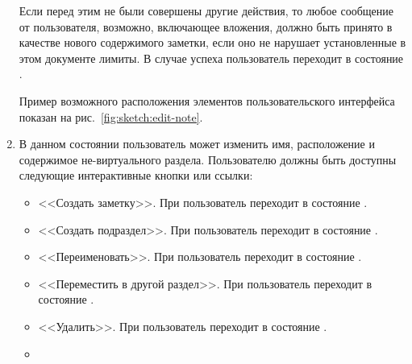 \begin{enumerate}
            Если перед этим не были совершены другие действия, то любое сообщение от пользователя,
            возможно, включающее вложения, должно быть принято в качестве нового содержимого заметки,
            если оно не нарушает установленные в этом документе лимиты. В случае успеха
            пользователь переходит в состояние
            \hyperref[itm:req:ui:states:view-note]
            {}.

            Пример возможного расположения элементов пользовательского интерфейса показан на
            рис.~\ref{fig:sketch:edit-note}.

        \item \label{itm:req:ui:states:edit-section}

            В данном состоянии пользователь может изменить имя, расположение и содержимое не-виртуального
            раздела.
            Пользователю должны быть доступны следующие интерактивные кнопки или ссылки:
            \begin{itemize}
                \item
                    <<Создать заметку>>.
                    При  пользователь переходит в состояние
                    \hyperref[itm:req:ui:states:create-note]
                    {}.
                \item
                    <<Создать подраздел>>.
                    При  пользователь переходит в состояние
                    \hyperref[itm:req:ui:states:create-section]
                    {}.
                \item
                    <<Переименовать>>.
                    При  пользователь переходит в состояние
                    \hyperref[itm:req:ui:states:rename-kbo]
                    {}.
                \item
                    <<Переместить в другой раздел>>.
                    При  пользователь переходит в состояние
                    \hyperref[itm:req:ui:states:move-kbo]
                    {}.
                \item
                    <<Удалить>>.
                    При  пользователь переходит в состояние
                    \hyperref[itm:req:ui:states:delete-kbo]
                    {}.
                \item

\end{itemize}
\end{enumerate}

